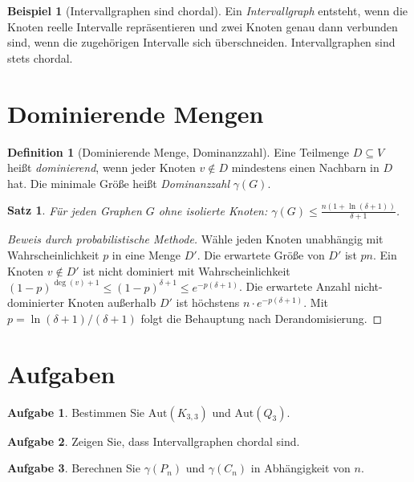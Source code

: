 ﻿\documentclass[a4paper,12pt,openany,oneside]{book}
\theoremstyle{definition}
\newtheorem{definition}{Definition}[chapter]
\newtheorem{beispiel}{Beispiel}[chapter]
\newtheorem{aufgabe}{Aufgabe}[chapter]
\theoremstyle{plain}
\newtheorem{satz}{Satz}[chapter]
\theoremstyle{remark}
\begin{document}
\begin{beispiel}[Intervallgraphen sind chordal]
  Ein \emph{Intervallgraph} entsteht, wenn die Knoten reelle Intervalle
  repr\"asentieren und zwei Knoten genau dann verbunden sind, wenn die
  zugeh\"origen Intervalle sich \"uberschneiden. Intervallgraphen sind
  stets chordal.
\end{beispiel}

\section{Dominierende Mengen}

\begin{definition}[Dominierende Menge, Dominanzzahl]
  Eine Teilmenge $D \subseteq V$ hei\ss{}t \emph{dominierend}, wenn jeder
  Knoten $v \notin D$ mindestens einen Nachbarn in $D$ hat.
  Die minimale Gr\"o\ss{}e hei\ss{}t \emph{Dominanzzahl} $\gamma(G)$.
\end{definition}

\begin{satz}
  F\"ur jeden Graphen $G$ ohne isolierte Knoten:
  $\gamma(G) \leq \frac{n(1 + \ln(\delta+1))}{\delta+1}$.
\end{satz}

\begin{proof}[Beweis durch probabilistische Methode]
  W\"ahle jeden Knoten unabh\"angig mit Wahrscheinlichkeit $p$ in eine
  Menge $D'$. Die erwartete Gr\"o\ss{}e von $D'$ ist $pn$. Ein Knoten
  $v \notin D'$ ist nicht dominiert mit Wahrscheinlichkeit $(1-p)^{\deg(v)+1}
  \leq (1-p)^{\delta+1} \leq e^{-p(\delta+1)}$. Die erwartete Anzahl
  nicht-dominierter Knoten au\ss{}erhalb $D'$ ist h\"ochstens
  $n \cdot e^{-p(\delta+1)}$. Mit $p = \ln(\delta+1)/(\delta+1)$
  folgt die Behauptung nach Derandomisierung.
\end{proof}

\section{Aufgaben}

\begin{aufgabe}
  Bestimmen Sie $\mathrm{Aut}(K_{3,3})$ und $\mathrm{Aut}(Q_3)$.
\end{aufgabe}

\begin{aufgabe}
  Zeigen Sie, dass Intervallgraphen chordal sind.
\end{aufgabe}

\begin{aufgabe}
  Berechnen Sie $\gamma(P_n)$ und $\gamma(C_n)$ in Abh\"angigkeit von $n$.
\end{aufgabe}
\end{document}

